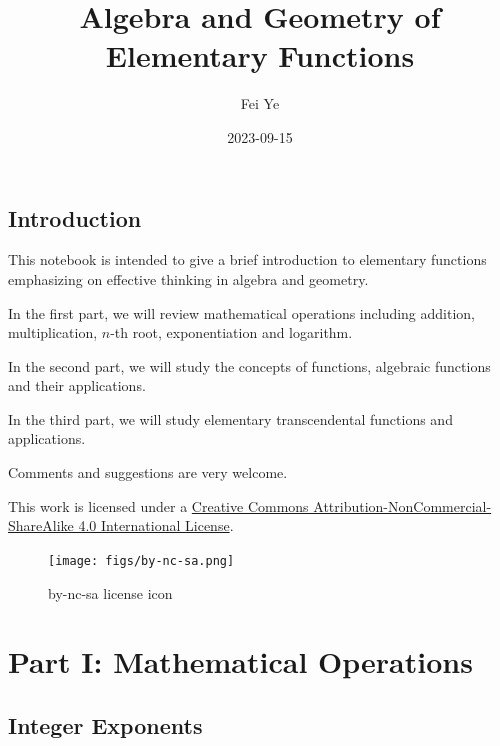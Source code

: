 \documentclass[
  en,11pt]{elegantbook}
\institute{QCC-CUNY}
\title{Algebra and Geometry of Elementary Functions}
\author{Fei Ye}
\date{2023-09-15}
\renewcommand{\baselinestretch}{1.1}
\renewcommand{\baselinestretch}{0.975}
\begin{document}
\maketitle

{
\setcounter{tocdepth}{0}
\tableofcontents
}

\mainmatter

\hypersetup{pageanchor=true}

\renewcommand{\baselinestretch}{1.05}\normalsize

\captionsetup[figure]{labelformat=empty}
\captionsetup[subfigure]{labelformat=empty}

\hypertarget{introduction}{%
\chapter*{Introduction}\label{introduction}}

This notebook is intended to give a brief introduction to elementary functions emphasizing on effective thinking in algebra and geometry.

In the first part, we will review mathematical operations including addition, multiplication, \(n\)-th root, exponentiation and logarithm.

In the second part, we will study the concepts of functions, algebraic functions and their applications.

In the third part, we will study elementary transcendental functions and applications.

Comments and suggestions are very welcome.

This work is licensed under a \href{https://creativecommons.org/licenses/by-nc-sa/4.0/}{Creative Commons Attribution-NonCommercial-ShareAlike 4.0 International License}.

\begin{figure}
\centering
\texttt{[image: figs/by-nc-sa.png]}
\caption{by-nc-sa license icon}
\end{figure}

\hypertarget{part-part-i-mathematical-operations}{%
\part*{Part I: Mathematical Operations}\label{part-part-i-mathematical-operations}}

\hypertarget{integer-exponents}{%
\chapter{Integer Exponents}\label{integer-exponents}}
\end{document}

